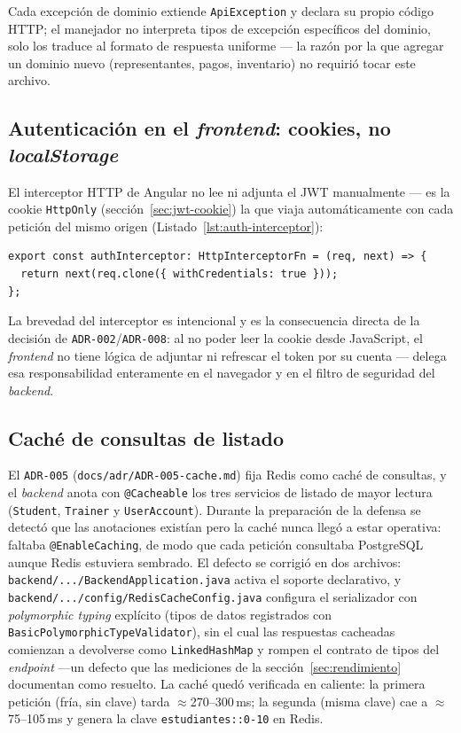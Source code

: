 \documentclass[11pt,a4paper]{article}
\newcommand{\ruta}[1]{\texttt{\footnotesize #1}}
\begin{document}
Cada excepción de dominio extiende \texttt{ApiException} y declara su
propio código HTTP; el manejador no interpreta tipos de excepción
específicos del dominio, solo los traduce al formato de respuesta
uniforme — la razón por la que agregar un dominio nuevo (representantes,
pagos, inventario) no requirió tocar este archivo.

\subsection{Autenticación en el \emph{frontend}: cookies, no \emph{localStorage}}

El interceptor HTTP de Angular no lee ni adjunta el JWT manualmente — es
la cookie \texttt{HttpOnly} (sección~\ref{sec:jwt-cookie}) la que viaja
automáticamente con cada petición del mismo origen
(Listado~\ref{lst:auth-interceptor}):

\begin{lstlisting}[caption={Interceptor de autenticación (\ruta{frontend/src/app/auth/auth.interceptor.ts})},label={lst:auth-interceptor}]
export const authInterceptor: HttpInterceptorFn = (req, next) => {
  return next(req.clone({ withCredentials: true }));
};
\end{lstlisting}

La brevedad del interceptor es intencional y es la consecuencia directa
de la decisión de \texttt{ADR-002}/\texttt{ADR-008}: al no poder leer la
cookie desde JavaScript, el \emph{frontend} no tiene lógica de adjuntar
ni refrescar el token por su cuenta — delega esa responsabilidad
enteramente en el navegador y en el filtro de seguridad del
\emph{backend}.

\subsection{Caché de consultas de listado}
\label{sec:cache-adr}

El \texttt{ADR-005} (\ruta{docs/adr/ADR-005-cache.md}) fija Redis como caché de consultas, y el
\emph{backend} anota con \texttt{@Cacheable} los tres servicios de
listado de mayor lectura (\texttt{Student}, \texttt{Trainer} y
\texttt{UserAccount}). Durante la preparación de la defensa se detectó
que las anotaciones existían pero la caché nunca llegó a estar
operativa: faltaba \texttt{@EnableCaching}, de modo que cada petición
consultaba PostgreSQL aunque Redis estuviera sembrado. El defecto se
corrigió en dos archivos: \ruta{backend/.../BackendApplication.java}
activa el soporte declarativo, y \ruta{backend/.../config/RedisCacheConfig.java}
configura el serializador con \emph{polymorphic typing} explícito
(tipos de datos registrados con \texttt{BasicPolymorphicTypeValidator}),
sin el cual las respuestas cacheadas comienzan a devolverse como
\texttt{LinkedHashMap} y rompen el contrato de tipos del \emph{endpoint}
—un defecto que las mediciones de la sección~\ref{sec:rendimiento}
documentan como resuelto. La caché quedó verificada en caliente: la
primera petición (fría, sin clave) tarda $\approx$270--300\,ms; la
segunda (misma clave) cae a $\approx$75--105\,ms y genera la clave
\texttt{estudiantes::0-10} en Redis.
\end{document}
